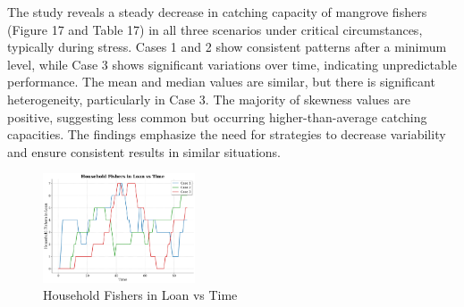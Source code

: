 \documentclass[final,5p,times,twocolumn,authoryear]{elsarticle}
\begin{document}
The study reveals a steady decrease in catching capacity of mangrove fishers (Figure 17 and Table 17) in all three scenarios under critical circumstances, typically during stress. Cases 1 and 2 show consistent patterns after a minimum level, while Case 3 shows significant variations over time, indicating unpredictable performance. The mean and median values are similar, but there is significant heterogeneity, particularly in Case 3. The majority of skewness values are positive, suggesting less common but occurring higher-than-average catching capacities. The findings emphasize the need for strategies to decrease variability and ensure consistent results in similar situations.\\
\begin{figure}[htbp]
    \centering
    \includegraphics[width=0.4\textwidth]{graph_all/plots_crit/household_fishers_in_loan_vs_time.png}
    \caption{Household Fishers in Loan vs Time}
    \label{fig:household_loan}
\end{figure}
\begin{table}[htbp]
    \centering
    \caption{Household Fishers in Loan - Statistical Analysis}
\end{table}
\end{document}
